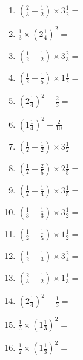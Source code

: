 \documentclass[12pt]{article}
\begin{document}
\begin{enumerate}
\item \large $ \left( \frac{2}{3} - \frac{1}{2} \right) \times 3 \frac{1}{2} = $ \vspace{1.6cm}
\item \large $ \frac{1}{3} \times \left( 2 \frac{1}{4} \right)^2 = $ \vspace{1.6cm}
\item \large $ \left( \frac{1}{2} - \frac{1}{2} \right) \times 3 \frac{2}{3} = $ \vspace{1.6cm}
\item \large $ \left( \frac{1}{2} - \frac{1}{5} \right) \times 1 \frac{1}{2} = $ \vspace{1.6cm}
\item \large $ \left( 2 \frac{1}{4} \right)^2 - \frac{2}{3} = $ \vspace{1.6cm}
\item \large $ \left( 1 \frac{1}{4} \right)^2 - \frac{2}{10} = $ \vspace{1.6cm}
\newpage
\item \large $ \left( \frac{1}{2} - \frac{1}{2} \right) \times 3 \frac{1}{2} = $ \vspace{1.6cm}
\item \large $ \left( \frac{1}{2} - \frac{2}{5} \right) \times 2 \frac{1}{5} = $ \vspace{1.6cm}
\item \large $ \left( \frac{1}{2} - \frac{1}{4} \right) \times 3 \frac{1}{5} = $ \vspace{1.6cm}
\item \large $ \left( \frac{1}{3} - \frac{1}{3} \right) \times 3 \frac{1}{2} = $ \vspace{1.6cm}
\item \large $ \left( \frac{1}{2} - \frac{1}{5} \right) \times 1 \frac{1}{2} = $ \vspace{1.6cm}
\item \large $ \left( \frac{1}{2} - \frac{1}{3} \right) \times 3 \frac{2}{4} = $ \vspace{1.6cm}
\item \large $ \left( \frac{2}{3} - \frac{1}{2} \right) \times 1 \frac{1}{3} = $ \vspace{1.6cm}
\item \large $ \left( 2 \frac{1}{4} \right)^2 - \frac{1}{3} = $ \vspace{1.6cm}
\item \large $ \frac{1}{3} \times \left( 1 \frac{1}{3} \right)^2 = $ \vspace{1.6cm}
\item \large $ \frac{1}{2} \times \left( 1 \frac{1}{3} \right)^2 = $ \vspace{1.6cm}

\end{enumerate}
\end{document}
